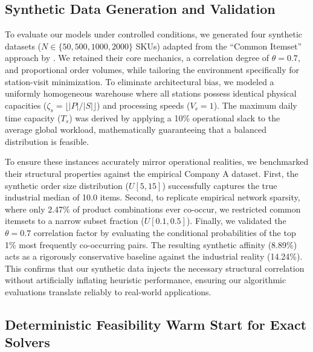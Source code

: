 \documentclass[preprint,review,11pt,authoryear]{elsarticle}
\begin{document}
\subsection{Synthetic Data Generation and Validation}

To evaluate our models under controlled conditions, we generated four synthetic datasets ($N \in \{50, 500, 1000, 2000\}$ SKUs) adapted from the ``Common Itemset'' approach by \cite{zhang2019cie}. We retained their core mechanics, a correlation degree of $\theta = 0.7$,  and proportional order volumes, while tailoring the environment specifically for station-visit minimization. To eliminate architectural bias, we modeled a uniformly homogeneous warehouse where all stations possess identical physical capacities ($\zeta_s = \lfloor |P| / |S| \rfloor$) and processing speeds ($V_s = 1$). The maximum daily time capacity ($T_s$) was derived by applying a 10\% operational slack to the average global workload, mathematically guaranteeing that a balanced distribution is feasible.

To ensure these instances accurately mirror operational realities, we benchmarked their structural properties against the empirical Company A dataset. First, the synthetic order size distribution ($U[5, 15]$) successfully captures the true industrial median of 10.0 items. Second, to replicate empirical network sparsity, where only 2.47\% of product combinations ever co-occur, we restricted common itemsets to a narrow subset fraction ($U[0.1, 0.5]$). Finally, we validated the $\theta = 0.7$ correlation factor by evaluating the conditional probabilities of the top 1\% most frequently co-occurring pairs. The resulting synthetic affinity (8.89\%) acts as a rigorously conservative baseline against the industrial reality (14.24\%). This confirms that our synthetic data injects the necessary structural correlation without artificially inflating heuristic performance, ensuring our algorithmic evaluations translate reliably to real-world applications.

\subsection{Deterministic Feasibility Warm Start for Exact Solvers}\label{sec:warm_start}
\end{document}
